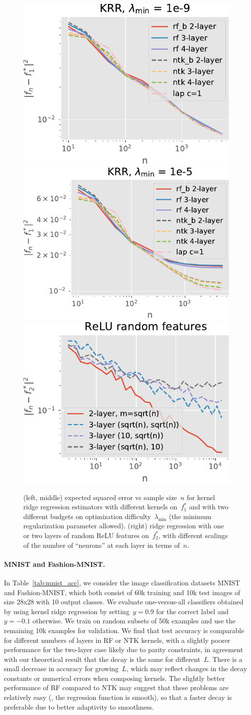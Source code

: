 \begin{figure}[tb]
	\centering
	\includegraphics[width=.32\textwidth]{figures/full_kernel_9.pdf}
	\includegraphics[width=.343\textwidth]{figures/full_kernel_5.pdf}
	\includegraphics[width=.32\textwidth]{figures/relu_rf.pdf}
	\caption{(left, middle) expected squared error vs sample size~$n$ for kernel ridge regression estimators with different kernels on~$f_1^*$ and with two different budgets on optimization difficulty~$\lambda_{\min}$ (the minimum regularization parameter allowed). (right) ridge regression with one or two layers of random ReLU features on~$f_2^*$, with different scalings of the number of ``neurons'' at each layer in terms of~$n$.}
	\label{fig:synthetic}
\end{figure}


\paragraph{MNIST and Fashion-MNIST.}
In Table~\ref{tab:mnist_acc}, we consider the image classification datasets MNIST and Fashion-MNIST, which both consist of 60k training and 10k test images of size 28x28 with 10 output classes.
We evaluate one-versus-all classifiers obtained by using kernel ridge regression by setting~$y=0.9$ for the correct label and~$y=-0.1$ otherwise.
We train on random subsets of 50k examples and use the remaining 10k examples for validation.
We find that test accuracy is comparable for different numbers of layers in RF or NTK kernels, with a slightly poorer performance for the two-layer case likely due to parity constraints, in agreement with our theoretical result that the decay is the same for different~$L$.
There is a small decrease in accuracy for growing~$L$, which may reflect changes in the decay constants or numerical errors when composing kernels.
The slightly better performance of RF compared to NTK may suggest that these problems are relatively easy (\eg, the regression function is smooth), so that a faster decay is preferable due to better adaptivity to smoothness.

